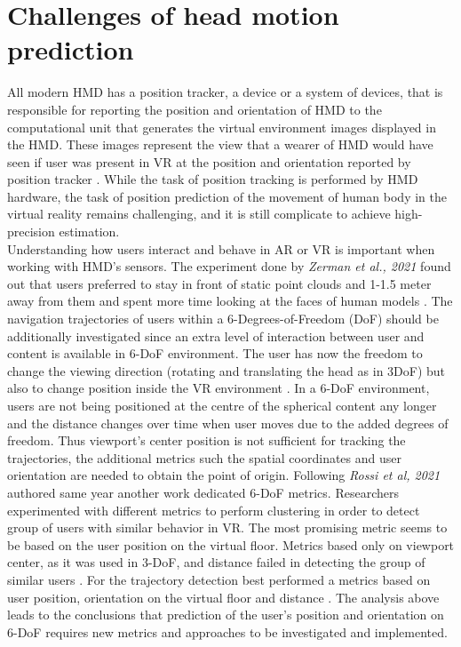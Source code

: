 \section{Challenges of head motion prediction}
\label{sec:theorie:head_pred}
All modern HMD has a position tracker, a device or a system of devices, that is responsible for reporting  the position and orientation of HMD to the computational unit that generates the virtual environment images displayed in the HMD. These images represent the view that a wearer of HMD would have seen if user was present in VR at the position and orientation reported by position tracker \cite{hmd}. While the task of position tracking is performed by HMD hardware, the task of position prediction of the movement of human body in the virtual reality remains challenging, and it is still complicate to achieve high-precision estimation. \\
Understanding how users interact and behave in AR or VR is important when working with HMD's sensors. The experiment done by \textit{Zerman et al., 2021} found out that users preferred to stay in front of static point clouds and 1-1.5 meter away from them and spent more time looking at the faces of human models \cite{user_behav_volumetric}. The navigation trajectories of users within a 6-Degrees-of-Freedom (DoF) should be additionally investigated since an extra level of interaction between user and content is available in 6-DoF environment. The user has now the freedom to change the viewing direction (rotating and translating the head as in 3DoF) but also to change position inside the VR environment \cite{new_challenge}. In a 6-DoF environment, users are not being positioned at the centre of the spherical content any longer and the distance changes over time when user moves due to the added degrees of freedom. Thus viewport’s center position is not sufficient for tracking the trajectories, the additional metrics such the spatial coordinates and user orientation are needed to obtain the point of origin. Following \cite{new_challenge} \textit{Rossi et al, 2021} authored same year another work \cite{6-dof_metrics} dedicated 6-DoF metrics. Researchers experimented with different metrics to perform clustering in order to detect group of users with similar behavior in VR. The most promising metric seems to be based on the user position on the virtual floor. Metrics based only on viewport center, as it was used in 3-DoF, and distance failed in detecting the group of similar users \cite{6-dof_metrics}. For the trajectory detection best performed a metrics based on user position, orientation on the virtual floor and distance \cite{6-dof_metrics}. The analysis above leads to the conclusions that prediction of the user's position and orientation on 6-DoF requires new metrics and approaches to be investigated and implemented. 